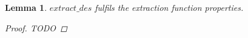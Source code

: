 \documentclass[11pt]{article} %
\newtheorem{lemma}{Lemma}
\begin{document}
%
%
%
%
%
%
%

\begin{lemma}

$extract\_des$ fulfils the extraction function properties.

\begin{proof}

TODO

\end{proof}

\end{lemma}
\end{document}
